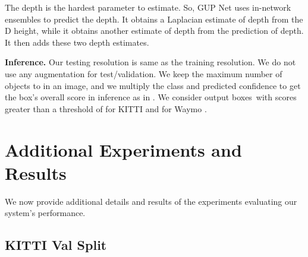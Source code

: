 \documentclass[runningheads]{llncs}
\newcommand{\twoD}{D}
\newcommand{\kitti}{KITTI}
\newcommand{\waymo}{Waymo}
\newcommand{\valOne}{Val}
\newcommand{\gupNet}{GUP Net}
\newcommand{\noIndentHeading}[1]{\noindent\textbf{#1}}
\begin{document}
            The depth is the hardest parameter to estimate\cite{ma2021delving}. 
            So, \gupNet{} uses in-network ensembles to predict the depth. 
            It obtains a Laplacian estimate of depth from the \twoD{} height, while it obtains another estimate of depth from the prediction of depth. 
            It then adds these two depth estimates.
    
\noIndentHeading{Inference.}\label{sec:det_testing_additional}
            Our testing resolution is same as the training resolution. 
            We do not use any augmentation for test/validation.
            We keep the maximum number of objects to  in an image, and we multiply the class and predicted confidence to get the box's overall score in inference as in \cite{kumar2021groomed}.
            We consider output boxes~with scores greater than a threshold of  for \kitti{} \cite{lu2021geometry} and  for \waymo{} \cite{reading2021categorical}.



\clearpage
\section{Additional Experiments and Results}\label{sec:additional_exp}
    We now provide additional details and results of the experiments evaluating our system's performance.

\subsection{\kitti{} \valOne{} Split}
\end{document}
